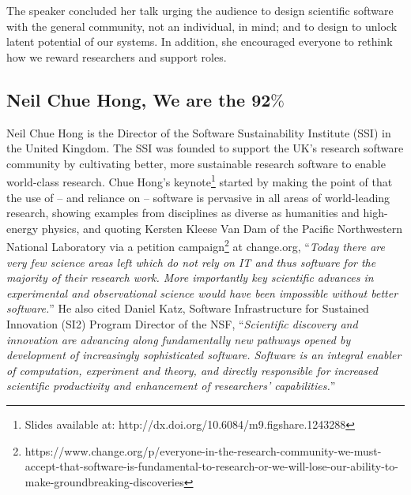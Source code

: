 \documentclass[11pt, oneside]{amsart}
\begin{document}
The speaker concluded her talk urging the audience to design scientific software
with the general community, not an individual, in mind; and to design to unlock
latent potential of our systems. In addition, she encouraged everyone to rethink
how we reward researchers and support roles.


\subsection{Neil Chue Hong, We are the 92$\%$}
\label{keynote2}
\begin{comment}
In a recent survey of UK research-intensive universities, 92\% of researchers
said they used research software and 68\% said their research would be impossible
without software. Yet 71\% have had no formal software training, and few are
ready to apply many of the things we take for granted such as testing or
virtualization. WSSSPE represents the pinnacle of what we understand to be the
best practice around scientific software in our community. My talk will
challenge the workshop participants to come up with ways of taking this best
practice to those 92\% of researchers in a way that will lead to maximum benefit
to the scientific community.
 \end{comment}


Neil Chue Hong is the Director of the Software Sustainability Institute (SSI) in the 
United Kingdom. The SSI was founded to support the UK's research software 
community by cultivating better, more sustainable research software to enable
world-class research. Chue Hong's keynote\footnote{Slides available at:
http://dx.doi.org/10.6084/m9.figshare.1243288} started by making the point of
that the use of -- and reliance on -- software is pervasive in all areas of
world-leading research, showing examples from disciplines as diverse as
humanities and high-energy physics, and quoting Kersten Kleese Van Dam of the
Pacific Northwestern National Laboratory via a petition
campaign\footnote{https://www.change.org/p/everyone-in-the-research-community-we-must-accept-that-software-is-fundamental-to-research-or-we-will-lose-our-ability-to-make-groundbreaking-discoveries}
at change.org, ``\emph{Today there are very few science areas left which do not
rely on IT and thus software for the majority of their research work. More
importantly key scientific advances in experimental and observational science
would have been impossible without better software.}'' He also cited Daniel
Katz, Software Infrastructure for Sustained Innovation (SI2) Program Director of
the NSF, ``\emph{Scientific discovery and innovation are advancing along
fundamentally new pathways opened by development of increasingly sophisticated
software. Software is an integral enabler of computation, experiment and theory,
and directly responsible for increased scientific productivity and enhancement
of researchers' capabilities.}''
\end{document}
